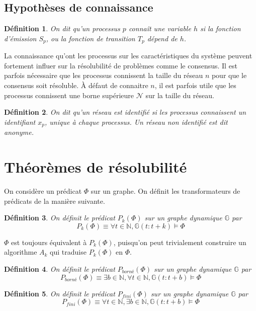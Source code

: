 \documentclass{article}
\newtheorem{definition}{Définition}
\begin{document}
\subsection{Hypothèses de connaissance}

\begin{definition}
	On dit qu'un processus $p$ \textit{connaît} une variable $h$ si la fonction d'émission $S_p$, ou la fonction de transition $T_p$ dépend de $h$. 
\end{definition}

La connaissance qu'ont les processus sur les caractéristiques du système peuvent fortement influer sur la résolubilité de problèmes comme le consensus.
Il est parfois nécessaire que les processus connissent la taille du réseau $n$ pour que le consensus soit résoluble.
À défaut de connaitre $n$, il est parfois utile que les processus connissent une borne supérieure $\mathcal{N}$ sur la taille du réseau.

\begin{definition}
	On dit qu'un réseau est \textit{identifié} si les processus connaissent un identifiant $x_p$, unique à chaque processus.
	Un réseau non identifié est dit \textit{anonyme}.
\end{definition}

\section{Théorèmes de résolubilité}

On considère un prédicat $\Phi$ sur un graphe. On définit les transformateurs de prédicats de la manière suivante.

\begin{definition}
	On définit le prédicat $P_k(\Phi)$ sur un graphe dynamique
	$\mathds{G}$ par $$P_k(\Phi) \equiv \forall t \in \mathds{N}, \mathds{G}(t:t+k) \models \Phi$$
\end{definition}

$\Phi$ est toujours équivalent à $P_k(\Phi)$, puisqu'on peut trivialement construire un algorithme $A_k$ qui traduise $P_k(\Phi)$ en $\Phi$.

\begin{definition}
	On définit le prédicat $P_{borné}(\Phi)$ sur un graphe dynamique
	$\mathds{G}$ par $$P_{borné}(\Phi) \equiv \exists b \in \mathds{N}, \forall t \in \mathds{N}, \mathds{G}(t:t+b) \models \Phi$$
\end{definition}
\begin{definition}
	On définit le prédicat $P_{fini}(\Phi)$ sur un graphe dynamique
	$\mathds{G}$ par $$P_{fini}(\Phi) \equiv  \forall t \in \mathds{N}, \exists b \in \mathds{N}, \mathds{G}(t:t+b) \models \Phi$$
\end{definition}
\end{document}
